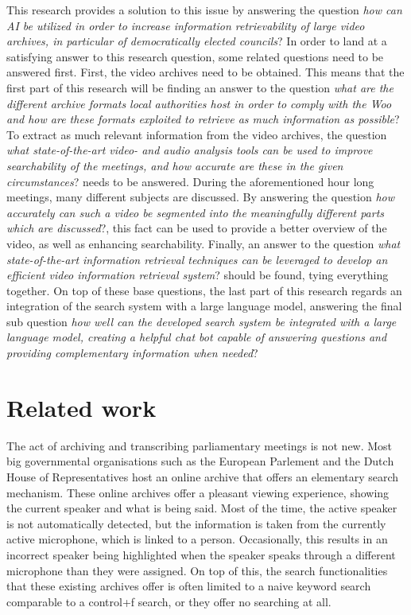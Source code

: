 \documentclass[twoside]{uva-inf-bachelor-thesis}
\begin{document}
This research provides a solution to this issue by answering the question \textit{how can AI be utilized in order to increase information retrievability of large video archives, in particular of democratically elected councils}? In order to land at a satisfying answer to this research question, some related questions need to be answered first. 
First, the video archives need to be obtained. This means that the first part of this research will be finding an answer to the question \textit{what are the different archive formats local authorities host in order to comply with the Woo and how are these formats exploited to retrieve as much information as possible}?
To extract as much relevant information from the video archives, the question \textit{what state-of-the-art video- and audio analysis tools can be used to improve searchability of the meetings, and how accurate are these in the given circumstances}? needs to be answered. During the aforementioned hour long meetings, many different subjects are discussed. By answering the question \textit{how accurately can such a video be segmented into the meaningfully different parts which are discussed}?, this fact can be used to provide a better overview of the video, as well as enhancing searchability. Finally, an answer to the question \textit{what state-of-the-art information retrieval techniques can be leveraged to develop an efficient video information retrieval system}? should be found, tying everything together.
On top of these base questions, the last part of this research regards an integration of the search system with a large language model, answering the final sub question \textit{how well can the developed search system be integrated with a large language model, creating a helpful chat bot capable of answering questions and providing complementary information when needed}?

\chapter{Related work}
The act of archiving and transcribing parliamentary meetings is not new. Most big governmental organisations such as the European Parlement and the Dutch House of Representatives host an online archive that offers an elementary search mechanism. 
These online archives offer a pleasant viewing experience, showing the current speaker and what is being said. Most of the time, the active speaker is not automatically detected, but the information is taken from the currently active microphone, which is linked to a person. Occasionally, this results in an incorrect speaker being highlighted when the speaker speaks through a different microphone than they were assigned.
On top of this, the search functionalities that these existing archives offer is often limited to a naive keyword search comparable to a control+f search, or they offer no searching at all.
\end{document}
